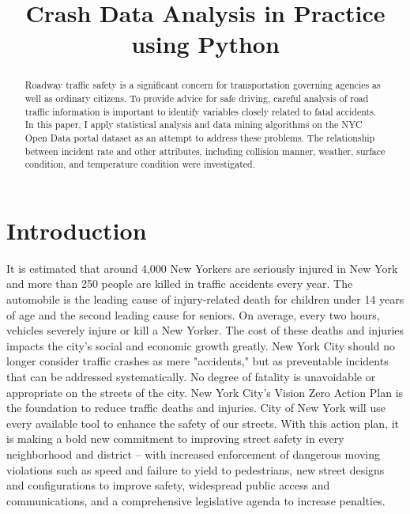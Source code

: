 \documentclass[conference]{IEEEtran}
\begin{document}
%
\title{Crash Data Analysis in Practice using Python}


\author{
}



\maketitle{}

\begin{abstract}
Roadway traffic safety is a significant concern for transportation governing agencies as well as ordinary citizens.  To provide advice for safe driving, careful analysis of road traffic information is important to identify variables closely related to fatal accidents.  In this paper, I apply statistical analysis and data mining algorithms on the NYC Open Data portal dataset as an attempt to address these problems. The relationship between incident rate and other attributes, including collision manner, weather, surface condition, and temperature condition were investigated.
\end{abstract}
\section{Introduction}
\label{sec:introduction}
It is estimated that around 4,000 New Yorkers are seriously injured in New York and more than 250 people are killed in traffic accidents every year. The automobile is the leading cause of injury-related death for children under 14 years of age and the second leading cause for seniors. On average, every two hours, vehicles severely injure or kill a New Yorker. The cost of these deaths and injuries impacts the city's social and economic growth greatly.  New York City should no longer consider traffic crashes as mere "accidents," but as preventable incidents that can be addressed systematically. No degree of fatality is unavoidable or appropriate on the streets of the city. New York City's Vision Zero Action Plan\cite{VisionZero} is the foundation to reduce traffic deaths and injuries. City of New York will use every available tool to enhance the safety of our streets. With this action plan, it is making a bold new commitment to improving street safety in every neighborhood and district – with increased enforcement of dangerous moving violations such as speed and failure to yield to pedestrians, new street designs and configurations to improve safety, widespread public access and communications, and a comprehensive legislative agenda to increase penalties. 
\end{document}
